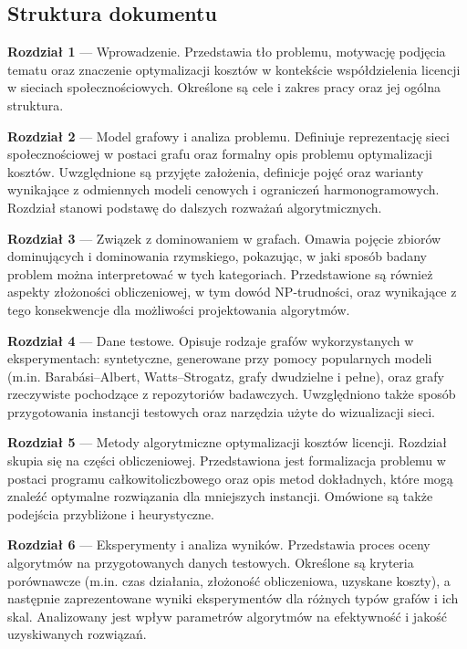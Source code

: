 \subsection*{Struktura dokumentu}
\begin{description}
    \item \textbf{Rozdział 1} --- Wprowadzenie. Przedstawia tło problemu, motywację podjęcia tematu oraz znaczenie optymalizacji kosztów w kontekście współdzielenia licencji w sieciach społecznościowych. Określone są cele i zakres pracy oraz jej ogólna struktura.

    \item \textbf{Rozdział 2} --- Model grafowy i analiza problemu. Definiuje reprezentację sieci społecznościowej w postaci grafu oraz formalny opis problemu optymalizacji kosztów. Uwzględnione są przyjęte założenia, definicje pojęć oraz warianty wynikające z odmiennych modeli cenowych i ograniczeń harmonogramowych. Rozdział stanowi podstawę do dalszych rozważań algorytmicznych.

    \item \textbf{Rozdział 3} --- Związek z dominowaniem w grafach. Omawia pojęcie zbiorów dominujących i dominowania rzymskiego, pokazując, w jaki sposób badany problem można interpretować w tych kategoriach. Przedstawione są również aspekty złożoności obliczeniowej, w tym dowód NP-trudności, oraz wynikające z tego konsekwencje dla możliwości projektowania algorytmów.

    \item \textbf{Rozdział 4} --- Dane testowe. Opisuje rodzaje grafów wykorzystanych w eksperymentach: syntetyczne, generowane przy pomocy popularnych modeli (m.in. Barabási–Albert, Watts–Strogatz, grafy dwudzielne i pełne), oraz grafy rzeczywiste pochodzące z repozytoriów badawczych. Uwzględniono także sposób przygotowania instancji testowych oraz narzędzia użyte do wizualizacji sieci.

    \item \textbf{Rozdział 5} --- Metody algorytmiczne optymalizacji kosztów licencji. Rozdział skupia się na części obliczeniowej. Przedstawiona jest formalizacja problemu w postaci programu całkowitoliczbowego oraz opis metod dokładnych, które mogą znaleźć optymalne rozwiązania dla mniejszych instancji. Omówione są także podejścia przybliżone i heurystyczne.

    \item \textbf{Rozdział 6} --- Eksperymenty i analiza wyników. Przedstawia proces oceny algorytmów na przygotowanych danych testowych. Określone są kryteria porównawcze (m.in. czas działania, złożoność obliczeniowa, uzyskane koszty), a następnie zaprezentowane wyniki eksperymentów dla różnych typów grafów i ich skal. Analizowany jest wpływ parametrów algorytmów na efektywność i jakość uzyskiwanych rozwiązań.


\end{description}
